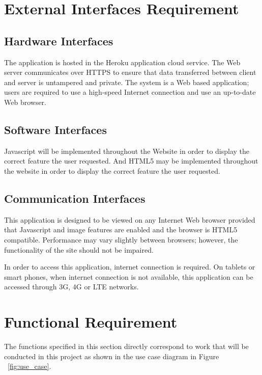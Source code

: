 
\section{External Interfaces Requirement}

\subsection{Hardware Interfaces}

The application is hosted in the Heroku application cloud service. The Web server communicates over HTTPS to ensure that data transferred between client and server is untampered and private. The system is a Web based application; users are required to use a high-speed Internet connection and use an up-to-date Web browser.

\subsection{Software Interfaces}

Javascript will be implemented throughout the Website in order to display the correct feature the user requested. And HTML5 may be implemented throughout the website in order to display the correct feature the user requested.

\subsection{Communication Interfaces}

This application is designed to be viewed on any Internet Web browser provided that Javascript and image features are enabled and the browser is HTML5 compatible. Performance may vary slightly between browsers; however, the functionality of the site should not be impaired.

In order to access this application, internet connection is required. On tablets or smart phones, when internet connection is not available, this application can be accessed through 3G, 4G or LTE networks.

\section{Functional Requirement}

The functions specified in this section directly correspond to work that will be conducted in this project as shown in the use case diagram in Figure ~\ref{fig:use_case}. 

